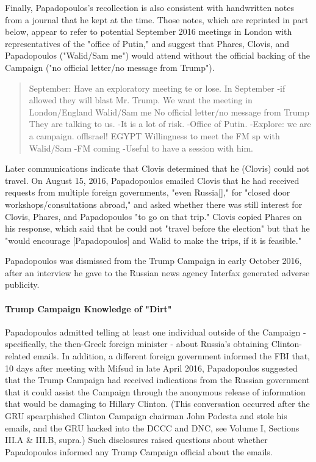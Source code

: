 Finally, Papadopoulos's recollection is also consistent with handwritten notes from a journal that he kept at the time.%
Those notes, which are reprinted in part below, appear to refer to potential September 2016 meetings in London with representatives of the "office of Putin," and suggest that Phares, Clovis, and Papadopoulos ("Walid/Sam me") would attend without the official backing of the Campaign ("no official letter/no message from Trump").%


\begin{quote}
September: Have an exploratory meeting te or lose. In September -if allowed they will blast Mr. Trump. We want the meeting in London/England Walid/Sam me No official letter/no message from Trump They are talking to us. -It is a lot of risk. -Office of Putin. -Explore: we are a campaign. offlsrael! EGYPT Willingness to meet the FM sp with Walid/Sam -FM coming -Useful to have a session with him.
\end{quote}

Later communications indicate that Clovis determined that he (Clovis) could not travel.
On August 15, 2016, Papadopoulos emailed Clovis that he had received requests from multiple foreign governments, "even Russia[]," for "closed door workshops/consultations abroad," and asked whether there was still interest for Clovis, Phares, and Papadopoulos "to go on that trip."%
Clovis copied Phares on his response, which said that he could not "travel before the election" but that he "would encourage [Papadopoulos] and Walid to make the trips, if it is feasible."%

Papadopoulos was dismissed from the Trump Campaign in early October 2016, after an interview he gave to the Russian news agency Interfax generated adverse publicity.%

\paragraph{Trump Campaign Knowledge of "Dirt"}

Papadopoulos admitted telling at least one individual outside of the Campaign - specifically, the then-Greek foreign minister - about Russia's obtaining Clinton-related emails.%
In addition, a different foreign government informed the FBI that, 10 days after meeting with Mifsud in late April 2016, Papadopoulos suggested that the Trump Campaign had received indications from the Russian government that it could assist the Campaign through the anonymous release of information that would be damaging to Hillary Clinton.%
(This conversation occurred after the GRU spearphished Clinton Campaign chairman John Podesta and stole his emails, and the GRU hacked into the DCCC and DNC, see Volume I, Sections III.A & III.B, supra.)
Such disclosures raised questions about whether Papadopoulos informed any Trump Campaign official about the emails.

